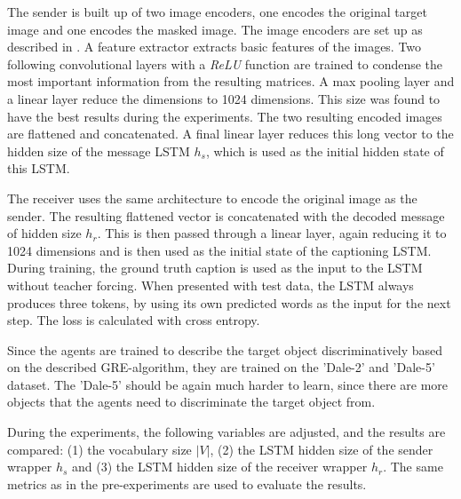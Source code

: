 The sender is built up of two image encoders, one encodes the original target image and one encodes the masked image.
The image encoders are set up as described in \citet{Johnson2017}.
A feature extractor extracts basic features of the images.
Two following convolutional layers with a \emph{ReLU} function are trained to condense the most important information from the resulting matrices.
A max pooling layer and a linear layer reduce the dimensions to 1024 dimensions.
This size was found to have the best results during the experiments.
The two resulting encoded images are flattened and concatenated.
A final linear layer reduces this long vector to the hidden size of the message LSTM $h_s$, which is used as the initial hidden state of this LSTM.

The receiver uses the same architecture to encode the original image as the sender.
The resulting flattened vector is concatenated with the decoded message of hidden size $h_r$.
This is then passed through a linear layer, again reducing it to 1024 dimensions and is then used as the initial state of the captioning LSTM.
During training, the ground truth caption is used as the input to the LSTM without teacher forcing.
When presented with test data, the LSTM always produces three tokens, by using its own predicted words as the input for the next step.
The loss is calculated with cross entropy.

Since the agents are trained to describe the target object discriminatively based on the described GRE-algorithm, they are trained on the 'Dale-2' and 'Dale-5' dataset.
The 'Dale-5' should be again much harder to learn, since there are more objects that the agents need to discriminate the target object from.

During the experiments, the following variables are adjusted, and the results are compared:
(1) the vocabulary size $|V|$,
(2) the LSTM hidden size of the sender wrapper $h_s$ and
(3) the LSTM hidden size of the receiver wrapper $h_r$.
The same metrics as in the pre-experiments are used to evaluate the results.

